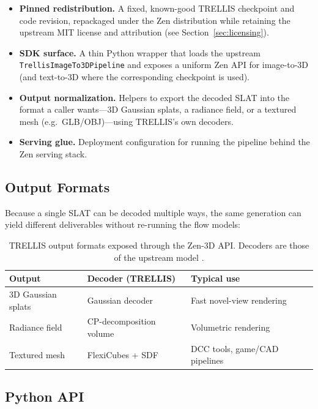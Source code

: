 \documentclass[11pt,a4paper]{article}
\begin{document}
\begin{itemize}
    \item \textbf{Pinned redistribution.} A fixed, known-good TRELLIS checkpoint and code
    revision, repackaged under the Zen distribution while retaining the upstream MIT license and
    attribution (see Section~\ref{sec:licensing}).
    \item \textbf{SDK surface.} A thin Python wrapper that loads the upstream
    \texttt{TrellisImageTo3DPipeline} and exposes a uniform Zen API for image-to-3D (and
    text-to-3D where the corresponding checkpoint is used).
    \item \textbf{Output normalization.} Helpers to export the decoded SLAT into the format a
    caller wants---3D Gaussian splats, a radiance field, or a textured mesh (e.g.\ GLB/OBJ)---using
    TRELLIS's own decoders.
    \item \textbf{Serving glue.} Deployment configuration for running the pipeline behind the Zen
    serving stack.
\end{itemize}

\subsection{Output Formats}

Because a single SLAT can be decoded multiple ways, the same generation can yield different
deliverables without re-running the flow models:

\begin{table}[H]
\centering
\begin{tabular}{lll}
\toprule
\textbf{Output} & \textbf{Decoder (TRELLIS)} & \textbf{Typical use} \\
\midrule
3D Gaussian splats & Gaussian decoder & Fast novel-view rendering \\
Radiance field & CP-decomposition volume & Volumetric rendering \\
Textured mesh & FlexiCubes + SDF & DCC tools, game/CAD pipelines \\
\bottomrule
\end{tabular}
\caption{TRELLIS output formats exposed through the Zen-3D API. Decoders are those of the
upstream model \cite{xiang2024trellis}.}
\end{table}

\subsection{Python API}
\end{document}
